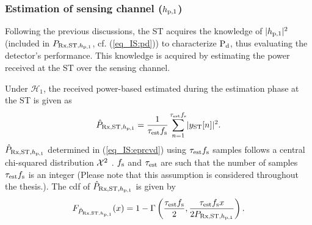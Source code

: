 \subsubsection{Estimation of sensing channel ($h_{\text{p,1}}$)}
Following the previous discussions, the ST acquires the knowledge of $|h_{\text{p,1}}|^2$ (included in $P_{\text{Rx,ST,$h_{\text{p,1}}$}}$, cf. (\ref{eq_IS:pd})) to characterize $\text{P}_{\text{d}}$, thus evaluating the detector's performance. This knowledge is acquired by estimating the power received at the ST over the sensing channel. %

Under $\mathcal H_1$, the received power-based estimated during the estimation phase at the ST is given as \cite{Urkowitz} 
\begin{align}
\hat{P}_{\text{Rx,ST,$h_{\text{p,1}}$}} = {\frac{1}{{\tau_{\text{est}} f_{\text{s}}}}\sum_{n=1}^{\tau_{\text{est}} f_{\text{s}}}} { |y_{\text{ST}}[n]|^2}.
\label{eq_IS:eprcvd} 
\end{align}
$\hat{P}_{\text{Rx,ST,$h_{\text{p,1}}$}}$ determined in (\ref{eq_IS:eprcvd}) using $\tau_{\text{est}} f_{\text{s}}$ samples follows a central chi-squared distribution $\cchi2$ \cite{Kay}. $f_{\text{s}}$ and $\tau_{\text{est}}$ are such that the number of samples $\tau_{\text{est}} f_{\text{s}}$ is an integer (Please note that this assumption is considered throughout the thesis.). 
The cdf of $\hat{P}_{\text{Rx,ST,$h_{\text{p,1}}$}}$ is given by  
\begin{align}
F_{\hat{P}_{\text{Rx,ST,$h_{\text{p,1}}$}}}(x) = 1 - \Gamma\left(\frac{\tau_{\text{est}} f_{\text{s}}}{2}, \frac{ \tau_{\text{est}} f_{\text{s}} x}{2 P_{\text{Rx,ST,$h_{\text{p,1}}$}}}  \right). 
\label{eq_IS:dprcvd}
\end{align}


